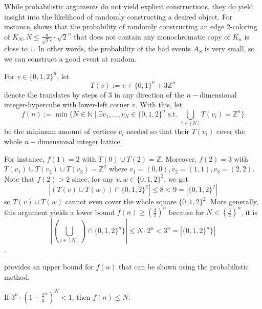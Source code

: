 \documentclass[../main.tex]{subfiles}
\begin{document}
\begin{remark}
	While probabilistic arguments do not yield explicit constructions, they do yield insight into the likelihood of randomly constructing a desired object. For instance,  shows that the probability of randomly constructing an edge 2-coloring of $K_N, N \leq \frac{n}{\sqrt{2}e}\cdot\sqrt{2}^n$ that does not contain any monochromatic copy of $K_n$ is close to $1$. In other words, the probability of the bad events $A_S$ is very small, so we can construct a good event at random.
\end{remark}

\begin{example}\label{ex:geomProb}
	For $v \in \{0,1,2\}^n$, let 
	$$T(v) := v + \{0,1\}^n + 3\mathbb{Z}^n$$
	denote the translates by steps of $3$ in any direction of the $n-$dimensional integer-hypercube with lower-left corner $v$. With this, let	 
	$$f(n) := \min\{N \in \mathbb{N} \mid \exists v_1, ..., v_N \in \{0,1,2\}^n \text{ s.t. } \bigcup_{i \in [N]} T(v_i) = \mathbb{Z}^n\}$$
	be the minimum amount of vertices $v_i$ needed so that their $T(v_i)$ cover the whole $n-$dimensional integer lattice.
	
	For instance, $f(1) = 2$ with $T(0) \cup T(2) = \mathbb{Z}$. Moreover, $f(2) = 3$ with $T(v_1) \cup T(v_2) \cup T(v_3) = \mathbb{Z}^2$ where $v_1 = (0,0), v_2 = (1,1), v_3 = (2,2)$. \TODO{\textcolor{red}{image}} Note that $f(2) > 2$ since, for any $v,w \in \{0,1,2\}^2$, we get $$|(T(v) \cup T(w)) \cap \{0,1,2\}^2| \leq 8 < 9 = |\{0,1,2\}^2|$$ so $T(v) \cup T(w)$ cannot even cover the whole square $\{0,1,2\}^2$. More generally, this argument yields a lower bound $f(n) \geq (\frac{3}{2})^n$ because for $N < (\frac{3}{2})^n$, it is $$|(\bigcup_{i \in [N]}) \cap \{0,1,2\}^n\}| \leq N \cdot 2^n < 3^n = |\{0,1,2\}^n\}|$$.
	
	 provides an upper bound for $f(n)$ that can be shown using the probabilistic method.
\end{example}	

\begin{proposition}\label{prop:geometryProb}
	If $3^n \cdot (1-\frac{2}{3}^n)^N < 1$, then $f(n) \leq N$.
\end{proposition}
	
\end{document}
